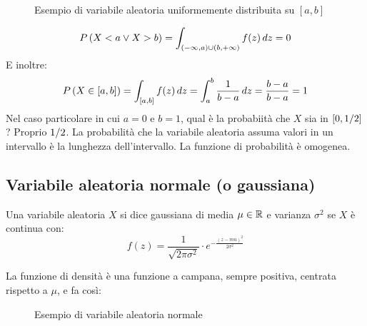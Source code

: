 \begin{figure}[ht]
\centering
{}
\caption{\label{fig:distribuzione}Esempio di variabile aleatoria uniformemente distribuita su $[a,b]$}
\end{figure}
\[
P \left( {X < a \lor X > b} \right) =
\int_{(-\infty,a) \cup (b,+\infty)} f(z) \, dz = 0
\]
E inoltre:
\[
P \left( {X \in [a,b]} \right) =
\int_{[a,b]} f(z) \, dz = \int_{a}^{b} \frac{1}{b - a} \, dz = 
\frac{b - a}{b - a} = 1
\]
Nel caso particolare in cui $a = 0$ e $b = 1$, qual \`e la probabiit\`a che $X$ sia in $[0, {1}/{2}]$? Proprio ${1}/{2}$. La probabilit\`a che la variabile aleatoria assuma valori in un intervallo \`e la lunghezza dell'intervallo. La funzione di probabilit\`a \`e omogenea.

\subsection{Variabile aleatoria normale (o gaussiana)}

\begin{defn}
Una variabile aleatoria $X$ si dice gaussiana di media $\mu \in \mathbb{R}$ e varianza $\sigma^2$ se $X$ \`e continua con:
\[
f(z) = \frac{1}{\sqrt{2 \pi \sigma^2}} \cdot e^{-\frac{(z - mu)^2}{2 \sigma^2}}
\]
\end{defn}

La funzione di densit\`a \`e una funzione a campana, sempre positiva, centrata rispetto a $\mu$, e fa cos\`i:


\begin{figure}[ht]
\centering
{}
\caption{Esempio di variabile aleatoria normale}
\end{figure}

